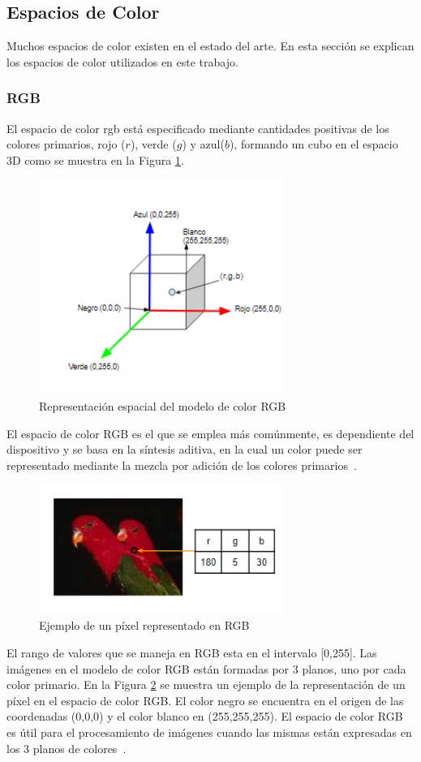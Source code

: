 \subsection{Espacios de Color}
Muchos espacios de color existen en el estado del arte. En esta sección se explican los espacios de color utilizados en este trabajo.
\subsubsection{RGB}
  
El espacio de color \gls{rgb} está especificado mediante cantidades positivas de los colores primarios, rojo ($r$), verde ($g$) y azul($b$), formando un cubo en el espacio 3D como se muestra en la Figura \ref{img:rgb-diagrama}. 
\begin{figure}[h!]
\centering
\includegraphics[width=80mm]{./figuras/diagrama-rgb.png}
\caption{Representación espacial del modelo de color RGB}
\label{img:rgb-diagrama}
\end{figure}
El espacio de color RGB es el que se emplea más comúnmente, es dependiente del dispositivo y se basa en la síntesis aditiva, en la cual un color puede ser representado mediante la mezcla por adición de los colores primarios~\cite{OrtizZamora2002}.
\begin{figure}[h!]
\centering
\includegraphics[width=80mm]{./figuras/ejemplo-rgb.png}
\caption{Ejemplo de un píxel representado en RGB}
\label{img:ejemplo-diagrama}
\end{figure}
El rango de valores que se maneja en RGB esta en el intervalo [0,255]. Las imágenes en el modelo de color RGB están formadas por 3 planos, uno por cada color primario. En la Figura \ref{img:ejemplo-diagrama} se muestra un ejemplo de la representación de un píxel en el espacio de color RGB. El color negro se encuentra en el origen de las coordenadas (0,0,0) y el color blanco en (255,255,255). El espacio de color RGB es útil para el procesamiento de imágenes cuando las mismas están expresadas en los 3 planos de colores~\cite{gonzalesdigital}. 

